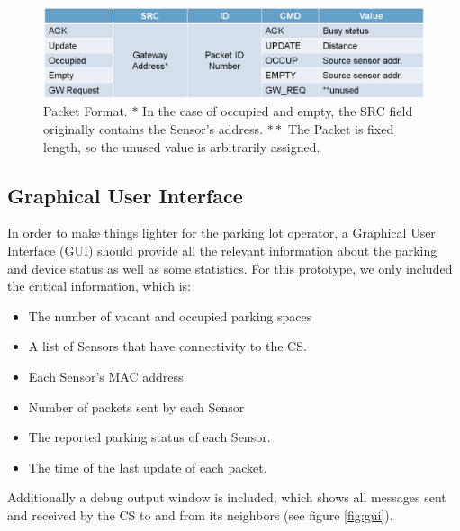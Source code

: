 \begin{figure}
    \centering
    \includegraphics[width=15cm]{images/General_PacketFormat.png}
	\vspace{-1.5em}
    \caption[Packet format]{Packet Format. 
	\(\ast\) In the case of occupied and empty, the SRC field originally contains the Sensor's address.
	\(\ast\ast\) The Packet is fixed length, so the unused value is arbitrarily assigned.}
    \vspace{-1.5em}
    \label{fig:packet}
\end{figure}

\subsection{Graphical User Interface}
\label{sec:gui}
In order to make things lighter for the parking lot operator, a Graphical User Interface (GUI) should provide all the relevant information about the parking and device status as well as some statistics.
For this prototype, we only included the critical information, which is:
\begin{itemize}[noitemsep] 
	\item The number of vacant and occupied parking spaces
	\item A list of Sensors that have connectivity to the CS.
	\item Each Sensor's MAC address.
	\item Number of packets sent by each Sensor
	\item The reported parking status of each Sensor.
	\item The time of the last update of each packet.
\end{itemize}

Additionally a debug output window is included, which shows all messages sent and received by the CS to and from its neighbors (see figure \ref{fig:gui}).


